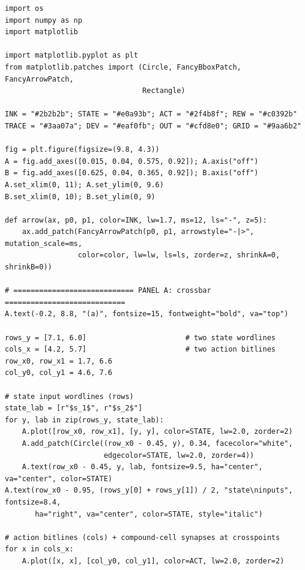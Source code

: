 \begin{lstlisting}[caption={schematics.ipynb code cell 7},label={lst:mrl-nb-schematics-7}]
import os
import numpy as np
import matplotlib

import matplotlib.pyplot as plt
from matplotlib.patches import (Circle, FancyBboxPatch, FancyArrowPatch,
                                Rectangle)

INK = "#2b2b2b"; STATE = "#e0a93b"; ACT = "#2f4b8f"; REW = "#c0392b"
TRACE = "#3aa07a"; DEV = "#eaf0fb"; OUT = "#cfd8e0"; GRID = "#9aa6b2"

fig = plt.figure(figsize=(9.8, 4.3))
A = fig.add_axes([0.015, 0.04, 0.575, 0.92]); A.axis("off")
B = fig.add_axes([0.625, 0.04, 0.365, 0.92]); B.axis("off")
A.set_xlim(0, 11); A.set_ylim(0, 9.6)
B.set_xlim(0, 10); B.set_ylim(0, 9)

def arrow(ax, p0, p1, color=INK, lw=1.7, ms=12, ls="-", z=5):
    ax.add_patch(FancyArrowPatch(p0, p1, arrowstyle="-|>", mutation_scale=ms,
                 color=color, lw=lw, ls=ls, zorder=z, shrinkA=0, shrinkB=0))

# ============================ PANEL A: crossbar ============================
A.text(-0.2, 8.8, "(a)", fontsize=15, fontweight="bold", va="top")

rows_y = [7.1, 6.0]                       # two state wordlines
cols_x = [4.2, 5.7]                       # two action bitlines
row_x0, row_x1 = 1.7, 6.6
col_y0, col_y1 = 4.6, 7.6

# state input wordlines (rows)
state_lab = [r"$s_1$", r"$s_2$"]
for y, lab in zip(rows_y, state_lab):
    A.plot([row_x0, row_x1], [y, y], color=STATE, lw=2.0, zorder=2)
    A.add_patch(Circle((row_x0 - 0.45, y), 0.34, facecolor="white",
                       edgecolor=STATE, lw=2.0, zorder=4))
    A.text(row_x0 - 0.45, y, lab, fontsize=9.5, ha="center", va="center", color=STATE)
A.text(row_x0 - 0.95, (rows_y[0] + rows_y[1]) / 2, "state\ninputs", fontsize=8.4,
       ha="right", va="center", color=STATE, style="italic")

# action bitlines (cols) + compound-cell synapses at crosspoints
for x in cols_x:
    A.plot([x, x], [col_y0, col_y1], color=ACT, lw=2.0, zorder=2)


\end{lstlisting}
